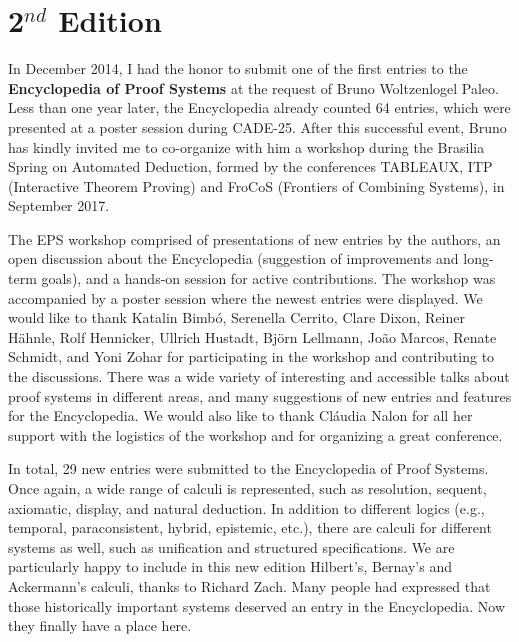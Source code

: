 \preface
\vspace{-150pt}
\section*{2$^{nd}$ Edition}
\vspace{130pt}

In December 2014, I had the honor to submit one of the first entries to the
\textbf{Encyclopedia of Proof Systems} at the request of Bruno Woltzenlogel
Paleo.
%
Less than one year later, the Encyclopedia already counted 64 entries, which
were presented at a poster session during CADE-25.
%
After this successful event, Bruno has kindly invited me to co-organize with him
a workshop during the Brasilia Spring on Automated Deduction, formed by the
conferences TABLEAUX, ITP (Interactive Theorem Proving) and FroCoS (Frontiers of
Combining Systems), in September 2017.

The EPS workshop comprised of presentations of new entries by the authors, an
open discussion about the Encyclopedia (suggestion of improvements and long-term
goals), and a hands-on session for active contributions.
%
The workshop was accompanied by a poster session where the newest entries were
displayed.
%
We would like to thank
Katalin Bimb\'{o},
Serenella Cerrito,
Clare Dixon,
Reiner H\"{a}hnle,
Rolf Hennicker,
Ullrich Hustadt,
Bj\"{o}rn Lellmann,
Jo\~{a}o Marcos,
Renate Schmidt, and
Yoni Zohar
for participating in the workshop and contributing to the discussions.
%
There was a wide variety of interesting and accessible talks about proof systems
in different areas, and many suggestions of new entries and features for
the Encyclopedia.
%
We would also like to thank Cl\'{a}udia Nalon for all her support with the
logistics of the workshop and for organizing a great conference.

In total, 29 new entries were submitted to the Encyclopedia of
Proof Systems.
%
Once again, a wide range of calculi is represented, such as resolution, sequent,
axiomatic, display, and natural deduction.
%
In addition to different logics (e.g., temporal, paraconsistent, hybrid,
epistemic, etc.), there are calculi for different systems as well, such as
unification and structured specifications.
%
We are particularly happy to include in this new edition Hilbert's, Bernay's and
Ackermann's calculi, thanks to Richard Zach.
%
Many people had expressed that those historically important systems deserved an
entry in the Encyclopedia. Now they finally have a place here.

